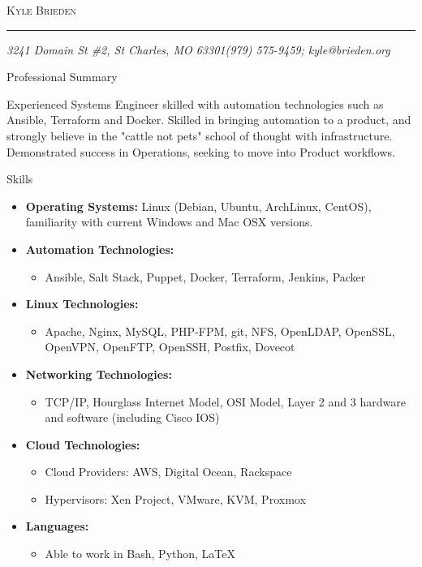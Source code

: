 \documentclass[10pt,oneside]{article}
\makeatletter
\newcommand{\name}{Kyle Brieden}
\newcommand{\addr}{3241 Domain St \#2, St Charles, MO 63301}
\newcommand{\phone}{(979) 575-9459}
\newcommand{\email}{kyle@brieden.org}
\newcommand{\bigname}[1]{
    \begin{center}\fontfamily{phv}\selectfont\Huge\scshape#1\end{center}
}
\newenvironment{ressection}[1]{
    \vspace{4pt}
    {\fontfamily{phv}\selectfont\Large#1}
    \begin{itemize}
    \vspace{3pt}
}{
    \end{itemize}
}
\newcommand{\resitem}[1]{
    \vspace{-4pt}
    \item \begin{flushleft} #1 \end{flushleft}
}
\newcommand{\ressubitem}[1]{
    \vspace{-1pt}
    \item \begin{flushleft} #1 \end{flushleft}
}
\newenvironment{reslist}[1]{
    \resitem{\textbf{#1}}
    \vspace{-5pt}
    \begin{itemize}
}{
    \end{itemize}
}
\makeatother
\begin{document}
 \selectfont

\bigname{\name}

\vspace{-8pt} \rule{\textwidth}{1pt}

\vspace{-1pt} {\small\itshape \addr \hfill \phone; \email}

\vspace{8 pt}




\begin{ressection}{Professional Summary}

    \begin{resobj}{Experienced Systems Engineer skilled with automation technologies such as Ansible, Terraform and Docker.  Skilled in bringing automation to a product, and strongly believe in the "cattle not pets" school of thought with infrastructure.  Demonstrated success in Operations, seeking to move into Product workflows.}
   \end{resobj}

\end{ressection}
\begin{ressection}{Skills}

    \resitem{\textbf{Operating Systems:} Linux (Debian, Ubuntu, ArchLinux, CentOS), familiarity with current Windows and Mac OSX versions.}

    \begin{reslist}{Automation Technologies:}
        \ressubitem{Ansible, Salt Stack, Puppet, Docker, Terraform, Jenkins, Packer}
    \end{reslist}

    \begin{reslist}{Linux Technologies:}
        \ressubitem{Apache, Nginx, MySQL, PHP-FPM, git, NFS, OpenLDAP, OpenSSL, OpenVPN, OpenFTP, OpenSSH, Postfix, Dovecot}
    \end{reslist}

    \begin{reslist}{Networking Technologies:}
        \ressubitem{TCP/IP, Hourglass Internet Model, OSI Model, Layer 2 and 3 hardware and software (including Cisco IOS)}
    \end{reslist}

    \begin{reslist}{Cloud Technologies:}
		\ressubitem{Cloud Providers:  AWS, Digital Ocean, Rackspace}
        \ressubitem{Hypervisors:  Xen Project, VMware, KVM, Proxmox}
    \end{reslist}

    \begin{reslist}{Languages:}

        \ressubitem{Able to work in Bash, Python, \LaTeX\ }

    \end{reslist}

\end{ressection}
\end{document}
